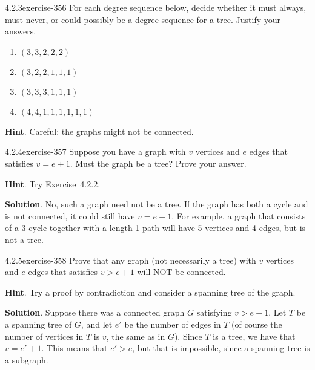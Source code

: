 \documentclass[twoside,11pt,]{book}
\numberwithin{equation}{chapter}
\newcommand{\gt}{>}
\begin{document}
\begin{divisionsolution}{4.2.3}{}{exercise-356}%
\hypertarget{p-4576}{}%
For each degree sequence below, decide whether it must always, must never, or could possibly be a degree sequence for a tree.  Justify your answers.\leavevmode%
\begin{enumerate}[label=(\alph*)]
\item\hypertarget{li-2272}{}\hypertarget{p-4577}{}%
\((3, 3, 2, 2, 2)\)%
\item\hypertarget{li-2273}{}\hypertarget{p-4578}{}%
\((3, 2, 2, 1, 1, 1)\)%
\item\hypertarget{li-2274}{}\hypertarget{p-4579}{}%
\((3, 3, 3, 1, 1, 1)\)%
\item\hypertarget{li-2275}{}\hypertarget{p-4580}{}%
\((4, 4, 1, 1, 1, 1, 1, 1)\)%
\end{enumerate}
%
\par\smallskip%
\noindent\textbf{Hint}.\quad%
\hypertarget{p-4581}{}%
Careful: the graphs might not be connected.%
\end{divisionsolution}%
\begin{divisionsolution}{4.2.4}{}{exercise-357}%
\hypertarget{p-4582}{}%
Suppose you have a graph with \(v\) vertices and \(e\) edges that satisfies \(v = e+1\). Must the graph be a tree? Prove your answer.%
\par\smallskip%
\noindent\textbf{Hint}.\quad%
\hypertarget{p-4583}{}%
Try Exercise~4.2.2.%
\par\smallskip%
\noindent\textbf{Solution}.\quad%
\hypertarget{p-4584}{}%
No, such a graph need not be a tree. If the graph has both a cycle and is not connected, it could still have \(v=e+1\). For example, a graph that consists of a 3-cycle together with a length 1 path will have 5 vertices and 4 edges, but is not a tree.%
\end{divisionsolution}%
\begin{divisionsolution}{4.2.5}{}{exercise-358}%
\hypertarget{p-4585}{}%
Prove that any graph (not necessarily a tree) with \(v\) vertices and \(e\) edges that satisfies \(v \gt e+1\) will NOT be connected.%
\par\smallskip%
\noindent\textbf{Hint}.\quad%
\hypertarget{p-4586}{}%
Try a proof by contradiction and consider a spanning tree of the graph.%
\par\smallskip%
\noindent\textbf{Solution}.\quad%
\hypertarget{p-4587}{}%
Suppose there was a connected graph \(G\) satisfying \(v \gt e+1\). Let \(T\) be a spanning tree of \(G\), and let \(e'\) be the number of edges in \(T\) (of course the number of vertices in \(T\) is \(v\), the same as in \(G\)). Since \(T\) is a tree, we have that \(v = e'+1\). This means that \(e' \gt e\), but that is impossible, since a spanning tree is a subgraph.%
\end{divisionsolution}%
\end{document}
